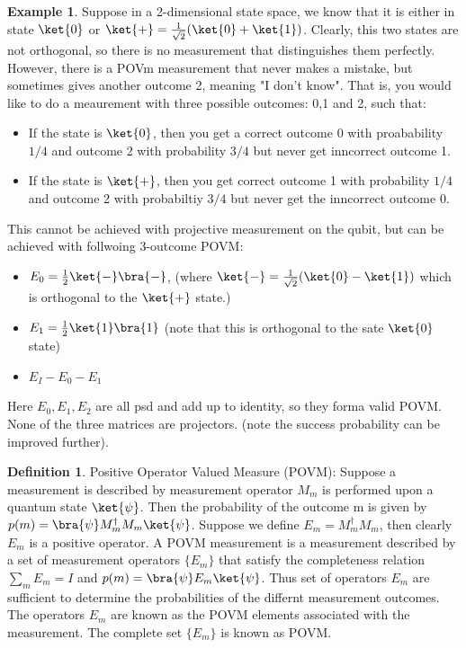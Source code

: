 \documentclass[12pt, oneside]{book}
\theoremstyle{definition}
\newtheorem{definition}{Definition}[section]
\theoremstyle{definition}
\newtheorem{example}{Example}[section]
\theoremstyle{remark}
\begin{document}
\begin{example}
    Suppose in a 2-dimensional state space, we know that it is either in state $\ket{0}$ or $\ket{+}=\frac{1}{\sqrt{2}}(\ket{0}+\ket{1})$.
    Clearly, this two states are not orthogonal, so there is no measurement that distinguishes them perfectly. However, there is a POVm measurement that never makes a mistake,
    but sometimes gives another outcome 2, meaning "I don't know". That is, you would like to do a meaurement with three possible outcomes: 0,1 and 2, such that:
    \begin{itemize}
        \item If the state is $\ket{0}$, then you get a correct outcome 0 with proabability $1/4$ and outcome 2 with 
        probability $3/4$ but never get inncorrect outcome 1.
        \item If the state is $\ket{+}$, then you get correct outcome 1 with probability $1/4$ and outcome 2 with probabiltiy $3/4$ but never get the inncorrect outcome 0.
    \end{itemize}
    This cannot be achieved with projective measurement on the qubit, but can be achieved with follwoing 3-outcome POVM:
    \begin{itemize}
        \item $E_0=\frac{1}{2}\ket{-}\bra{-}$, (where $\ket{-}=\frac{1}{\sqrt{2}}(\ket{0}-\ket{1})$ which is orthogonal to the $\ket{+}$ state.)
        \item $E_1=\frac{1}{2}\ket{1}\bra{1}$ (note that this is orthogonal to the sate $\ket{0}$ state)
        \item $E_I-E_0-E_1$
    \end{itemize}
    Here $E_0,E_1,E_2$ are all psd and add up to identity, so they forma  valid POVM. None of the three matrices are projectors. (note the success probability can be improved further).
\end{example}
\begin{definition}
    Positive Operator Valued Measure (POVM): Suppose a measurement is described by measurement operator $M_m$ is performed upon a quantum state $\ket{\psi}$. Then the probability of 
    the outcome m is given by $p(m)=\bra{\psi}M_m^{\dagger}M_m\ket{\psi}$. Suppose we define $E_m=M_m^{\dagger}M_m$, then clearly $E_m$ is a positive operator. A POVM measurement is a measurement described by a set of measurement operators $\{E_m\}$ that satisfy the 
    completeness relation $\sum_m E_m=I$ and $p(m)=\bra{\psi}E_m\ket{\psi}$. Thus set of operators $E_m$ are sufficient to determine the probabilities of the differnt measurement outcomes.
    The operators $E_m$ are known as the POVM elements associated with the measurement. The complete set $\{E_m\}$ is known as POVM.
\end{definition}
\end{document}
